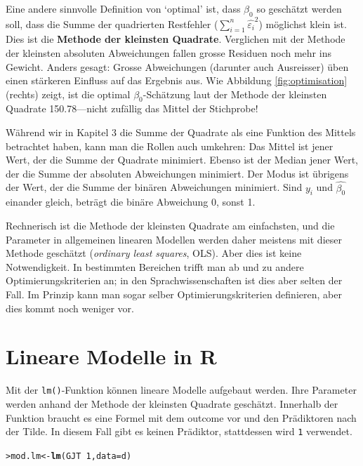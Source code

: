 \documentclass[oneside, 10pt]{book}\usepackage[]{graphicx}\usepackage[]{xcolor}
\makeatletter
\newcommand{\hlnum}[1]{\textcolor[rgb]{0.686,0.059,0.569}{#1}}%
\newcommand{\hlopt}[1]{\textcolor[rgb]{0,0,0}{#1}}%
\newcommand{\hlstd}[1]{\textcolor[rgb]{0.345,0.345,0.345}{#1}}%
\newcommand{\hlkwb}[1]{\textcolor[rgb]{0.69,0.353,0.396}{#1}}%
\newcommand{\hlkwc}[1]{\textcolor[rgb]{0.333,0.667,0.333}{#1}}%
\newcommand{\hlkwd}[1]{\textcolor[rgb]{0.737,0.353,0.396}{\textbf{#1}}}%
\newenvironment{kframe}{%
 \def\at@end@of@kframe{}%
 \ifinner\ifhmode%
  \def\at@end@of@kframe{\end{minipage}}%
  \begin{minipage}{\columnwidth}%
 \fi\fi%
 \def\FrameCommand##1{\hskip\@totalleftmargin \hskip-\fboxsep
 \colorbox{shadecolor}{##1}\hskip-\fboxsep
     \hskip-\linewidth \hskip-\@totalleftmargin \hskip\columnwidth}%
 \MakeFramed {\advance\hsize-\width
   \@totalleftmargin\z@ \linewidth\hsize
   \@setminipage}}%
 {\par\unskip\endMakeFramed%
 \at@end@of@kframe}
\newenvironment{knitrout}{}{} %
\makeatother
\begin{document}
Eine andere sinnvolle Definition von `optimal' ist,
dass $\beta_0$ so geschätzt werden soll, dass
die Summe der quadrierten Restfehler
($\sum_{i = 1}^{n} \widehat{\varepsilon_i}^2$) möglichst klein ist.
Dies ist die \textbf{Methode der kleinsten Quadrate}.
Verglichen mit der Methode der kleinsten absoluten Abweichungen
fallen grosse Residuen noch mehr ins Gewicht.
Anders gesagt: Grosse Abweichungen (darunter auch Ausreisser) üben
einen stärkeren Einfluss auf das Ergebnis aus.
Wie Abbildung \ref{fig:optimisation} (rechts) zeigt,
ist die optimal $\beta_0$-Schätzung laut der Methode
der kleinsten Quadrate 150.78---nicht zufällig das Mittel
der Stichprobe!

Während wir in Kapitel 3 die Summe der Quadrate als eine
Funktion des Mittels betrachtet haben, kann man die Rollen
auch umkehren: Das Mittel ist jener Wert, der die Summe
der Quadrate minimiert. Ebenso ist der Median jener Wert,
der die Summe der absoluten Abweichungen minimiert.
Der Modus ist übrigens der Wert, der die Summe der binären 
Abweichungen minimiert. 
Sind $y_i$ und $\widehat{\beta_0}$ einander gleich, beträgt 
die binäre Abweichung 0, sonst 1.

Rechnerisch ist die Methode der kleinsten Quadrate am einfachsten,
und die Parameter in allgemeinen linearen Modellen werden daher
meistens mit dieser Methode geschätzt
(\textit{ordinary least squares}, OLS).
Aber dies ist keine Notwendigkeit.
In bestimmten Bereichen trifft man ab und zu andere Optimierungskriterien an;
in den Sprachwissenschaften ist dies aber selten der Fall.
Im Prinzip kann man sogar selber Optimierungskriterien
definieren, aber dies kommt noch weniger vor.

\section{Lineare Modelle in R}
Mit der \texttt{lm()}-Funktion können lineare Modelle aufgebaut werden.
Ihre Parameter werden anhand der Methode der kleinsten Quadrate geschätzt.
Innerhalb der Funktion braucht es eine Formel mit dem outcome
vor und den Prädiktoren nach der Tilde. In diesem Fall gibt es keinen
Prädiktor, stattdessen wird \texttt{1} verwendet.




\begin{knitrout}
\color{fgcolor}\begin{kframe}
\begin{alltt}
\hlstd{> }\hlstd{mod.lm} \hlkwb{<-} \hlkwd{lm}\hlstd{(GJT} \hlopt{~} \hlnum{1}\hlstd{,} \hlkwc{data} \hlstd{= d)}
\end{alltt}
\end{kframe}
\end{knitrout}
\end{document}
